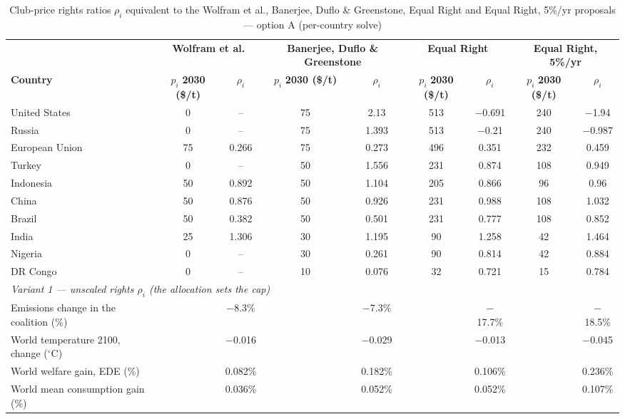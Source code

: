 \begin{table}[htbp]
\centering
\small
\caption{Club-price rights ratios $\rho_i$ equivalent to the Wolfram et al., Banerjee, Duflo \& Greenstone, Equal Right and Equal Right, 5\%/yr proposals --- option A (per-country solve)}
\renewcommand{\arraystretch}{1.15}
\begin{tabular}{lcccccccc}
  \toprule
  & \multicolumn{2}{c}{\textbf{Wolfram et al.}} & \multicolumn{2}{c}{\textbf{Banerjee, Duflo \& Greenstone}} & \multicolumn{2}{c}{\textbf{Equal Right}} & \multicolumn{2}{c}{\textbf{Equal Right, 5\%/yr}} \\
  \cmidrule(lr){2-3} \cmidrule(lr){4-5} \cmidrule(lr){6-7} \cmidrule(lr){8-9}
  \textbf{Country} & $p_i$ \textbf{2030 (\$/t)} & $\rho_i$ & $p_i$ \textbf{2030 (\$/t)} & $\rho_i$ & $p_i$ \textbf{2030 (\$/t)} & $\rho_i$ & $p_i$ \textbf{2030 (\$/t)} & $\rho_i$ \\
  \midrule
  United States & 0 & -- & 75 & 2.13 & 513 & $-$0.691 & 240 & $-$1.94 \\
  Russia & 0 & -- & 75 & 1.393 & 513 & $-$0.21 & 240 & $-$0.987 \\
  European Union & 75 & 0.266 & 75 & 0.273 & 496 & 0.351 & 232 & 0.459 \\
  Turkey & 0 & -- & 50 & 1.556 & 231 & 0.874 & 108 & 0.949 \\
  Indonesia & 50 & 0.892 & 50 & 1.104 & 205 & 0.866 & 96 & 0.96 \\
  China & 50 & 0.876 & 50 & 0.926 & 231 & 0.988 & 108 & 1.032 \\
  Brazil & 50 & 0.382 & 50 & 0.501 & 231 & 0.777 & 108 & 0.852 \\
  India & 25 & 1.306 & 30 & 1.195 & 90 & 1.258 & 42 & 1.464 \\
  Nigeria & 0 & -- & 30 & 0.261 & 90 & 0.814 & 42 & 0.884 \\
  DR Congo & 0 & -- & 10 & 0.076 & 32 & 0.721 & 15 & 0.784 \\
  \midrule
  \multicolumn{9}{l}{\textit{Variant 1 --- unscaled rights $\rho_i$ (the allocation sets the cap)}} \\
  \quad Emissions change in the coalition (\%) &  & $-$8.3\% &  & $-$7.3\% &  & $-$17.7\% &  & $-$18.5\% \\
  \quad World temperature 2100, change ($^\circ$C) &  & $-$0.016 &  & $-$0.029 &  & $-$0.013 &  & $-$0.045 \\
  \quad World welfare gain, EDE (\%) &  & 0.082\% &  & 0.182\% &  & 0.106\% &  & 0.236\% \\
  \quad World mean consumption gain (\%) &  & 0.036\% &  & 0.052\% &  & 0.052\% &  & 0.107\% \\

\end{tabular}
\end{table}
